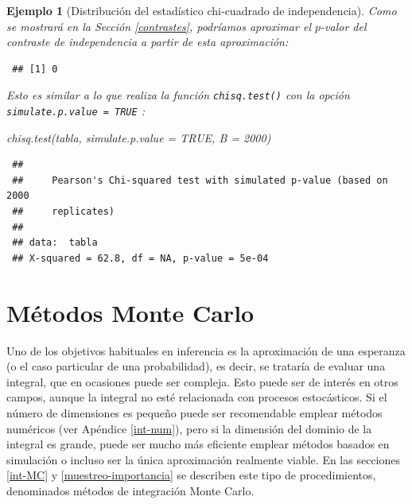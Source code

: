 \documentclass[
  10pt,
]{book}
\newenvironment{Shaded}{\begin{snugshade}}{\end{snugshade}}
\newcommand{\AttributeTok}[1]{\textcolor[rgb]{0.77,0.63,0.00}{#1}}
\newcommand{\ConstantTok}[1]{\textcolor[rgb]{0.00,0.00,0.00}{#1}}
\newcommand{\DecValTok}[1]{\textcolor[rgb]{0.00,0.00,0.81}{#1}}
\newcommand{\FunctionTok}[1]{\textcolor[rgb]{0.00,0.00,0.00}{#1}}
\newcommand{\NormalTok}[1]{#1}
\newcommand{\OtherTok}[1]{\textcolor[rgb]{0.56,0.35,0.01}{#1}}
\newcommand{\SpecialCharTok}[1]{\textcolor[rgb]{0.00,0.00,0.00}{#1}}
\theoremstyle{break}
\newtheorem{example}{Ejemplo}[chapter]
\theoremstyle{nonumberplain}
\begin{document}
\begin{example}[Distribución del estadístico chi-cuadrado de independencia]
Como se mostrará en la Sección \ref{contrastes}, podríamos aproximar el \(p\)-valor del contraste de independencia a partir de esta aproximación:

\begin{Shaded}
\end{Shaded}

\begin{verbatim}
 ## [1] 0
\end{verbatim}

Esto es similar a lo que realiza la función \texttt{chisq.test()} con la opción \texttt{simulate.p.value\ =\ TRUE} \citep[empleando el algoritmo de][]{patefield1981}:

\begin{Shaded}
\begin{Highlighting}[]
\FunctionTok{chisq.test}\NormalTok{(tabla, }\AttributeTok{simulate.p.value =} \ConstantTok{TRUE}\NormalTok{, }\AttributeTok{B =} \DecValTok{2000}\NormalTok{)}
\end{Highlighting}
\end{Shaded}

\begin{verbatim}
 ## 
 ##     Pearson's Chi-squared test with simulated p-value (based on 2000
 ##     replicates)
 ## 
 ## data:  tabla
 ## X-squared = 62.8, df = NA, p-value = 5e-04
\end{verbatim}

\end{example}

\hypertarget{monte-carlo}{%
\chapter{Métodos Monte Carlo}\label{monte-carlo}}

Uno de los objetivos habituales en inferencia es la aproximación de una esperanza (o el caso particular de una probabilidad), es decir, se trataría de evaluar una integral, que en ocasiones puede ser compleja.
Esto puede ser de interés en otros campos, aunque la integral no esté relacionada con procesos estocásticos.
Si el número de dimensiones es pequeño puede ser recomendable emplear métodos numéricos (ver Apéndice \ref{int-num}), pero si la dimensión del dominio de la integral es grande, puede ser mucho más eficiente emplear métodos basados en simulación o incluso ser la única aproximación realmente viable.
En las secciones \ref{int-MC} y \ref{muestreo-importancia} se describen este tipo de procedimientos, denominados métodos de integración Monte Carlo.
\end{document}
